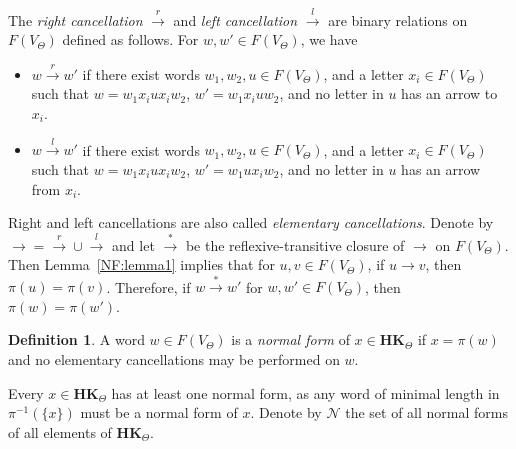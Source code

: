 \documentclass[pdflatex,sn-mathphys-num]{sn-jnl}
\newcommand{\hk}{\mathbf{HK}_{\Theta}}
\theoremstyle{definition}
\newtheorem{definition}[theorem]{Definition}
\theoremstyle{remark}
\begin{document}
The \emph{right cancellation} $\overset{r}{\to}$ and \emph{left cancellation} $\overset{l}{\to}$ are binary relations on $F(V_{\Theta})$ defined as follows.
For $w, w' \in F(V_{\Theta})$, we have
\begin{itemize}
   \item $w \overset{r}{\to} w'$ if there exist words $w_1, w_2, u \in F(V_{\Theta})$, and a letter $x_i \in F(V_{\Theta})$ such that 
   $w = w_1 x_i u x_i w_2$, $w' = w_1 x_i u w_2$, and no letter in $u$ has an arrow to $x_i$.
   \item $w \overset{l}{\to} w'$ if there exist words $w_1, w_2, u \in F(V_{\Theta})$, and a letter $x_i \in F(V_{\Theta})$ such that 
   $w = w_1 x_i u x_i w_2$, $w' = w_1 u x_i w_2$, and no letter in $u$ has an arrow from $x_i$.
\end{itemize}
Right and left cancellations are also called \emph{elementary cancellations}.
Denote by $\to = \overset{r}{\to} \cup \overset{l}{\to}$ and let $\overset{*}{\to}$ be the reflexive-transitive closure of $\to$ on $F(V_{\Theta})$.
Then Lemma~\ref{NF:lemma1} implies that for $u, v \in F(V_{\Theta})$, if $u \to v$, then $\pi(u) = \pi(v)$.
Therefore, if $w \overset{*}{\to} w'$ for $w, w' \in F(V_{\Theta})$, then $\pi(w) = \pi(w')$.

\begin{definition}
   A word $w \in F(V_{\Theta})$ is a \emph{normal form} of $x \in \hk$ if $x = \pi(w)$ and no elementary cancellations may be performed on $w$.
\end{definition}
Every $x \in \hk$ has at least one normal form, as any word of minimal length in $\pi^{-1}(\{x\})$ must be a normal form of $x$.
Denote by $\mathcal{N}$ the set of all normal forms of all elements of $\hk$.
\end{document}
